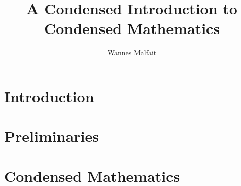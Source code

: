 \documentclass{article}
\title{A Condensed Introduction to Condensed Mathematics}
\author{Wannes Malfait}
\date{}
\begin{document}
\maketitle

\section{Introduction}
\section{Preliminaries}
\section{Condensed Mathematics}

\nocite{*}


\end{document}
